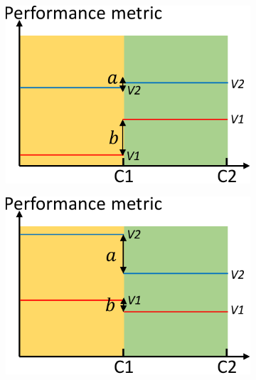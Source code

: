\begin{figure}[t]
\begin{subfigure}{0.25\textwidth}
                \caption{}
                \label{fig:description-b}
        \end{subfigure}%
        \begin{subfigure}{0.25\textwidth}
                \includegraphics[width=\linewidth]{Figures/background-c.pdf}
                \caption{}
                \label{fig:description-c}
        \end{subfigure}%
        \begin{subfigure}{0.25\textwidth}
                \includegraphics[width=\linewidth]{Figures/background-d.pdf}
                \caption{}

\end{subfigure}
\end{figure}
